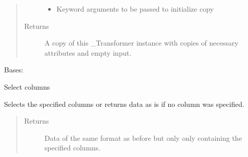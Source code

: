 \documentclass[letterpaper,10pt,english]{sphinxmanual}
\begin{document}
\begin{fulllineitems}
\begin{fulllineitems}
\begin{quote}
\begin{description}
\begin{itemize}
\item {} 
 \textendash{} Keyword arguments to be passed to initialize copy

\end{itemize}

\item[{Returns}] \leavevmode
A copy of this \_Transformer instance with copies of necessary
attributes and empty input.

\end{description}\end{quote}

\end{fulllineitems}


\end{fulllineitems}


\begin{fulllineitems}
\label{\detokenize{dalio.pipe:dalio.pipe.ColSelect}}
Bases: 

Select columns

\begin{fulllineitems}
\label{\detokenize{dalio.pipe:dalio.pipe.ColSelect.transform}}
Selects the specified columns or returns data as is if no column
was specified.
\begin{quote}\begin{description}
\item[{Returns}] \leavevmode
Data of the same format as before but only only containing the
specified columns.

\end{description}\end{quote}

\end{fulllineitems}


\end{fulllineitems}

\end{document}
